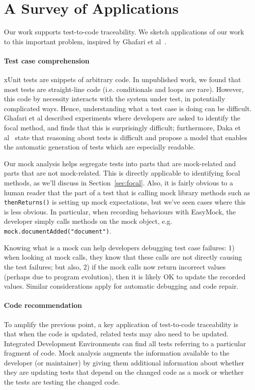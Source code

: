 \section{A Survey of Applications}
\label{sec:applications}

Our work supports test-to-code traceability. 
We sketch applications of our work to this important problem,
inspired by Ghafari et al~\cite{ghafari15:_autom}.

\paragraph{Test case comprehension} xUnit tests are snippets of arbitrary
code. In unpublished work, we found that most tests are
straight-line code (i.e. conditionals and loops are rare). 
However, this code by necessity interacts with
the system under test, in potentially complicated ways. Hence,
understanding what a test case is doing can be difficult. Ghafari et
al described experiments where developers are asked to identify the
focal method, and finds that this is surprisingly difficult;
furthermore, Daka et al~\cite{daka15:_model_readab_improv_unit_tests}
state that reasoning about tests is difficult and propose a model that
enables the automatic generation of tests which are especially
readable.

Our mock analysis helps segregate tests into parts that are
mock-related and parts that are not mock-related. This is directly applicable
to identifying focal methods, as we'll discuss in Section~\ref{sec:focal}.
Also, it is fairly
obvious to a human reader that the part of a test that is calling mock
library methods such as \texttt{thenReturns()} is setting up mock
expectations, but we've seen cases where this is less
obvious. In particular, when recording behaviours with EasyMock,
the developer simply calls methods on the mock object, e.g. 
\texttt{mock.documentAdded("document")}.

Knowing what is a mock can help developers debugging test case
failures: 1) when looking at
mock calls, they know that these calls are not
directly causing the test failures; but also, 2) if the mock calls
now return incorrect values (perhaps due to program evolution),
then it is likely OK to update the recorded values. 
Similar considerations
apply for automatic debugging and code repair.

\paragraph{Code recommendation}
To amplify the previous point, a key application of test-to-code
traceability is that when the code is updated, related tests may also
need to be updated. Integrated Development Environments can find
all tests referring to a particular fragment of code. Mock analysis
augments the information available to the developer (or maintainer) by
giving them additional information about whether they are updating
tests that depend on the changed code as a mock or whether the tests
are testing the changed code.

